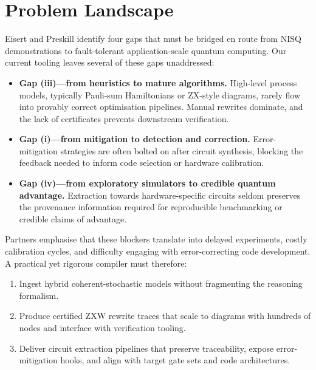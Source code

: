 \section{Problem Landscape}
Eisert and Preskill identify four gaps that must be bridged en route from NISQ demonstrations to fault-tolerant application-scale quantum computing. Our current tooling leaves several of these gaps unaddressed:
\begin{itemize}
  \item \textbf{Gap (iii)---from heuristics to mature algorithms.} High-level process models, typically Pauli-sum Hamiltonians or ZX-style diagrams, rarely flow into provably correct optimisation pipelines. Manual rewrites dominate, and the lack of certificates prevents downstream verification.
  \item \textbf{Gap (i)---from mitigation to detection and correction.} Error-mitigation strategies are often bolted on after circuit synthesis, blocking the feedback needed to inform code selection or hardware calibration.
  \item \textbf{Gap (iv)---from exploratory simulators to credible quantum advantage.} Extraction towards hardware-specific circuits seldom preserves the provenance information required for reproducible benchmarking or credible claims of advantage.
\end{itemize}

Partners emphasise that these blockers translate into delayed experiments, costly calibration cycles, and difficulty engaging with error-correcting code development. A practical yet rigorous compiler must therefore:
\begin{enumerate}
  \item Ingest hybrid coherent-stochastic models without fragmenting the reasoning formalism.
  \item Produce certified ZXW rewrite traces that scale to diagrams with hundreds of nodes and interface with verification tooling.
  \item Deliver circuit extraction pipelines that preserve traceability, expose error-mitigation hooks, and align with target gate sets and code architectures.
\end{enumerate}
